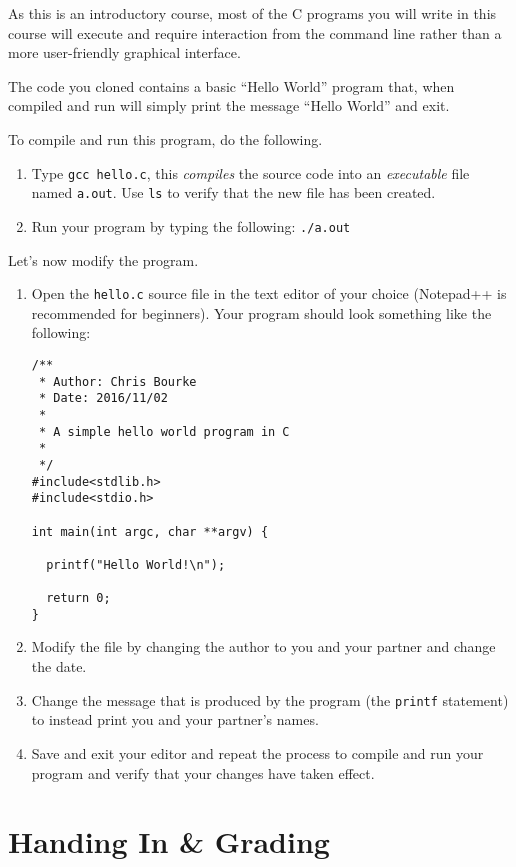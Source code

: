 \documentclass[12pt]{scrartcl}
\begin{document}
As this is an introductory course, most of the C programs you will write in 
this course will execute and require interaction from the command line 
rather than a more user-friendly graphical interface.  

The code you cloned contains a basic ``Hello World'' program that, when
compiled and run will simply print the message ``Hello World'' and exit.

To compile and run this program, do the following.
\begin{enumerate}
  \item Type \texttt{gcc hello.c}, this \emph{compiles} the source code
  	into an \emph{executable} file named \texttt{a.out}.  Use 
	\texttt{ls} to verify that the new file has been created.  
  \item Run your program by typing the following: \texttt{./a.out}
\end{enumerate}

Let's now modify the program. 

\begin{enumerate}
  \item Open the \texttt{hello.c} source file in the text editor of
  	your choice (Notepad++ is recommended for beginners).
  	Your program should look something like the following:

\begin{verbatim}
/**
 * Author: Chris Bourke
 * Date: 2016/11/02
 *
 * A simple hello world program in C
 *
 */
#include<stdlib.h>
#include<stdio.h>

int main(int argc, char **argv) {

  printf("Hello World!\n");

  return 0;
}
\end{verbatim}
  \item Modify the file by changing the author to you and your partner and change
  	the date.
  \item Change the message that is produced by the program (the
    \texttt{printf} statement) to instead
  	print you and your partner's names.
  \item Save and exit your editor and repeat the process to compile and run
  	your program and verify that your changes have taken effect.
\end{enumerate}

\section{Handing In \& Grading}
\end{document}
